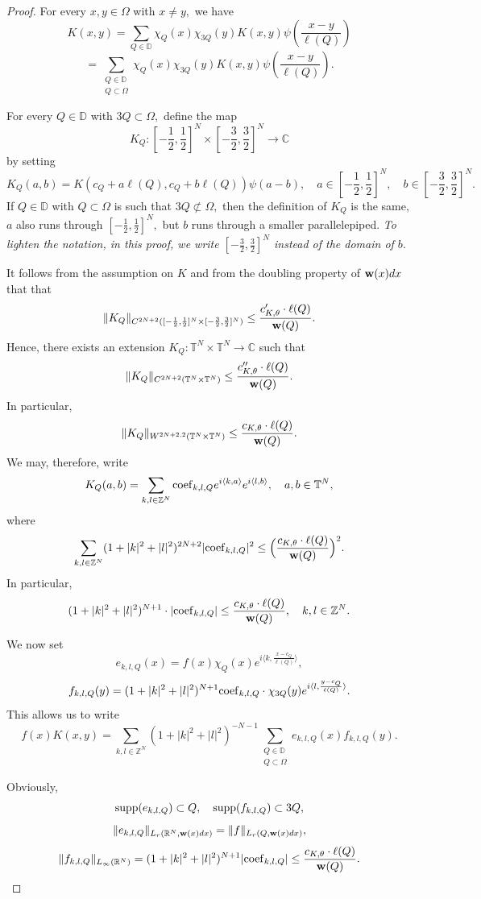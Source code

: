 \documentclass{amsart}
\begin{document}
\begin{proof}
For every $x,y\in \Omega$ with $x\neq y,$ we have
$$K(x,y)=\sum_{Q\in\mathbb{D}}\chi_Q(x)\chi_{3Q}(y)K(x,y)\psi\left(\frac{x-y}{\ell(Q)}\right)$$
$$=\sum_{\substack{Q\in\mathbb{D}\\ Q\subset\Omega}}\chi_Q(x)\chi_{3Q}(y)K(x,y)\psi\left(\frac{x-y}{\ell(Q)}\right).$$

For every $Q\in\mathbb{D}$ with $3Q\subset\Omega,$
define the map
$$K_Q:[-\frac12,\frac12]^N\times[-\frac32,\frac32]^N\to\mathbb{C}$$
by setting
$$K_Q(a,b)=K(c_Q+a\ell(Q),c_Q+b\ell(Q))\psi(a-b),\quad a\in[-\frac12,\frac12]^N,\quad
b\in[-\frac32,\frac32]^N.$$
If $Q\in\mathbb{D}$ with $Q\subset\Omega$ is such that $3Q\not\subset\Omega,$ then the definition of $K_Q$ is the same, $a$ also runs through $[-\frac12,\frac12]^N,$ but $b$ runs through a smaller parallelepiped. {\it To lighten the notation, in this proof, we write $[-\frac32,\frac32]^N$ instead of the domain of $b.$}

It follows from the assumption on $K$ and from the doubling property of ${\bf w}(x)dx$ that
that
$$\|K_Q\|_{C^{2N+2}([-\frac12,\frac12]^N\times[-\frac32,\frac32]^N)}\leq\frac{c_{K,\theta}'\cdot\ell(Q)}{{\bf w}(Q)}.$$
Hence, there exists an extension
$K_Q:\mathbb{T}^N\times\mathbb{T}^N\to\mathbb{C}$
such that
$$\|K_Q\|_{C^{2N+2}(\mathbb{T}^N\times\mathbb{T}^N)}\leq\frac{c_{K,\theta}''\cdot\ell(Q)}{{\bf w}(Q)}.$$
In particular,
$$\|K_Q\|_{W^{2N+2,2}(\mathbb{T}^N\times\mathbb{T}^N)}\leq\frac{c_{K,\theta}\cdot\ell(Q)}{{\bf w}(Q)}.$$
We may, therefore, write
$$K_Q(a,b)=\sum_{k,l\in\mathbb{Z}^N}{\rm coef}_{k,l,Q}e^{i\langle k,a\rangle}e^{i\langle l,b\rangle},\quad a,b\in\mathbb{T}^N,$$
where
$$\sum_{k,l\in\mathbb{Z}^N}(1+|k|^2+|l|^2)^{2N+2}|{\rm coef}_{k,l,Q}|^2\leq\Big(\frac{c_{K,\theta}\cdot\ell(Q)}{{\bf w}(Q)}\Big)^2.$$
In particular,
$$(1+|k|^2+|l|^2)^{N+1}\cdot|{\rm coef}_{k,l,Q}|\leq\frac{c_{K,\theta}\cdot\ell(Q)}{{\bf w}(Q)},\quad k,l\in\mathbb{Z}^N.$$

We now set
$$e_{k,l,Q}(x)=f(x)\chi_Q(x)e^{i\langle k,\frac{x-c_Q}{\ell(Q)}\rangle},$$
$$f_{k,l,Q}(y)=(1+|k|^2+|l|^2)^{N+1}{\rm coef}_{k,l,Q}\cdot\chi_{3Q}(y)e^{i\langle l,\frac{y-c_Q}{\ell(Q)}\rangle}.$$
This allows us to write
$$f(x)K(x,y)=\sum_{k,l\in\mathbb{Z}^N}(1+|k|^2+|l|^2)^{-N-1}\sum_{\substack{Q\in\mathbb{D}\\ Q\subset\Omega}}e_{k,l,Q}(x)f_{k,l,Q}(y).$$

Obviously,
$${\rm supp}(e_{k,l,Q})\subset Q,\quad{\rm supp}(f_{k,l,Q})\subset 3Q,$$
$$\|e_{k,l,Q}\|_{L_r(\mathbb{R}^N,{\bf w}(x)dx)}=\|f\|_{L_r(Q,{\bf w}(x)dx)},$$
$$\|f_{k,l,Q}\|_{L_{\infty}(\mathbb{R}^N)}=(1+|k|^2+|l|^2)^{N+1}|{\rm coef}_{k,l,Q}|
\leq\frac{c_{K,\theta}\cdot\ell(Q)}{{\bf w}(Q)}.$$
\end{proof}
\end{document}

